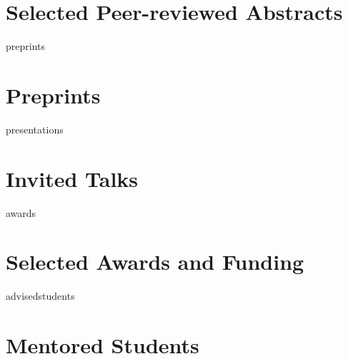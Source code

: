 \documentclass[12pt]{report} %
\begin{document}
\section{Selected Peer-reviewed Abstracts}
\abstracts{}
\fi



\ifcsname preprints\endcsname%
\section{Preprints}
\preprints{}
\fi



\ifcsname presentations\endcsname%
\section{Invited Talks}
\presentations{}
\fi



\ifcsname awards\endcsname%
\section{Selected Awards and Funding}
\awards{}
\fi



\iffalse
\ifcsname grants\endcsname%
\section{Grant Writing}
\grants{}
\fi
\fi



\ifcsname advisedstudents\endcsname%
\section{Mentored Students}
\advisedstudents{}
\fi
\end{document}
